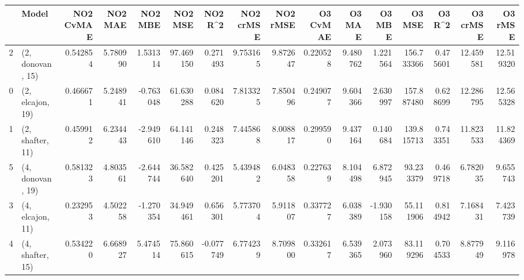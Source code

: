 \begin{tabular}{llrrrrrrrrrrrrrr}
\toprule
{} &             Model &  NO2 CvMAE &   NO2 MAE &   NO2 MBE &    NO2 MSE &   NO2 R\textasciicircum2 &  NO2 crMSE &  NO2 rMSE &  O3 CvMAE &    O3 MAE &    O3 MBE &      O3 MSE &    O3 R\textasciicircum2 &   O3 crMSE &    O3 rMSE \\
\midrule
2 &  (2, donovan, 15) &   0.542854 &  5.780990 &  1.531314 &  97.469150 &  0.271493 &   9.753165 &  9.872647 &  0.220528 &  9.480762 &  1.221564 &  156.733366 &  0.475601 &  12.459581 &  12.519320 \\
0 &  (2, elcajon, 19) &   0.466671 &  5.248941 & -0.763048 &  61.630288 &  0.084620 &   7.813325 &  7.850496 &  0.249077 &  9.604366 &  2.630997 &  157.887480 &  0.628699 &  12.286795 &  12.565328 \\
1 &  (2, shafter, 11) &   0.459912 &  6.234443 & -2.949610 &  64.141146 &  0.248323 &   7.445868 &  8.008817 &  0.299590 &  9.437164 &  0.140684 &  139.815713 &  0.743351 &  11.823533 &  11.824369 \\
5 &  (4, donovan, 19) &   0.581323 &  4.803561 & -2.644744 &  36.582640 &  0.425201 &   5.439482 &  6.048358 &  0.227639 &  8.104498 &  6.872945 &   93.233379 &  0.469718 &   6.782035 &   9.655743 \\
3 &  (4, elcajon, 11) &   0.232953 &  4.502258 & -1.270354 &  34.949461 &  0.656301 &   5.773704 &  5.911807 &  0.337727 &  6.038389 & -1.930158 &   55.111906 &  0.814942 &   7.168431 &   7.423739 \\
4 &  (4, shafter, 15) &   0.534220 &  6.668927 &  5.474514 &  75.860615 & -0.077749 &   6.774239 &  8.709800 &  0.332617 &  6.539365 &  2.073960 &   83.119296 &  0.704533 &   8.877949 &   9.116978 \\
\bottomrule
\end{tabular}
